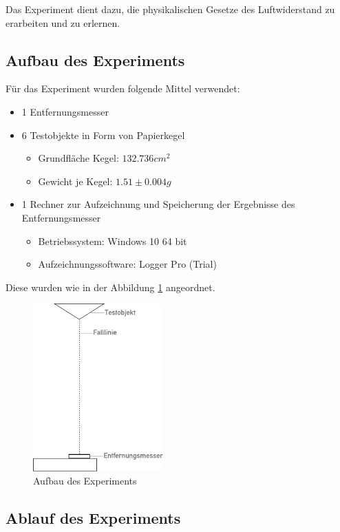 Das Experiment dient dazu, die physikalischen Gesetze des Luftwiderstand zu erarbeiten und zu erlernen. 

\subsection{Aufbau des Experiments}

Für das Experiment wurden folgende Mittel verwendet:

\begin{itemize}
	\item 1 Entfernungsmesser
	\item 6 Testobjekte in Form von Papierkegel
	\begin{itemize}
		\item \label{flaeche} Grundfläche Kegel: \(132.736 cm^2\)
		\item Gewicht je Kegel: \(1.51 \pm 0.004g \)
	\end{itemize}
	\item 1 Rechner zur Aufzeichnung und Speicherung der Ergebnisse des Entfernungsmesser
	\begin{itemize}
		\item Betriebssystem: Windows 10 64 bit
		\item Aufzeichnungssoftware: Logger Pro (Trial)
	\end{itemize}
\end{itemize}

Diese wurden wie in der Abbildung \ref{fig:expsetup} angeordnet.



\begin{figure}
	\center
	\includegraphics[width=5cm]{diagrams/experiment_aufbau}\caption{\label{fig:expsetup} Aufbau des Experiments}	
\end{figure}



\subsection{Ablauf des Experiments}


